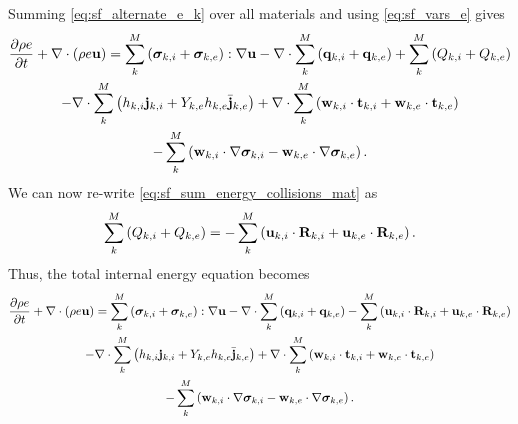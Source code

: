 \documentclass[a4paper,11pt]{report}
\begin{document}
Summing \cref{eq:sf_alternate_e_k} over all materials and using \cref{eq:sf_vars_e} gives
\begin{multline*}
    \frac{\partial \rho e}{\partial t} + \nabla \cdot \left( \rho e \mathbf{u} \right) = \sum_k^M \left( \bm \sigma_{k,i} + \bm \sigma_{k,e} \right) : \nabla \mathbf{u} - \nabla \cdot \sum_k^M \left( \mathbf{q}_{k,i} + \mathbf{q}_{k,e} \right) + \sum_k^M \left( Q_{k,i} + Q_{k,e} \right) \\
    - \nabla \cdot \sum_k^M \left( h_{k,i} \mathbf{j}_{k,i} + Y_{k,e} h_{k,e} \bar{\mathbf{j}}_{k,e} \right) + \nabla \cdot \sum_k^M \left( \mathbf{w}_{k,i} \cdot \mathbf{t}_{k,i} + \mathbf{w}_{k,e} \cdot \mathbf{t}_{k,e} \right) \\
    - \sum_k^M \left( \mathbf{w}_{k,i} \cdot \nabla \bm \sigma_{k,i} - \mathbf{w}_{k,e} \cdot \nabla \bm \sigma_{k,e} \right).
\end{multline*}
We can now re-write \cref{eq:sf_sum_energy_collisions_mat} as 
\begin{equation}
    \sum_k^M \left( Q_{k,i} + Q_{k,e} \right) = -\sum_k^M \left( \mathbf{u}_{k,i} \cdot \mathbf{R}_{k,i} + \mathbf{u}_{k,e} \cdot \mathbf{R}_{k,e} \right).
\end{equation}
Thus, the total internal energy equation becomes
\begin{multline*}
    \frac{\partial \rho e}{\partial t} + \nabla \cdot \left( \rho e \mathbf{u} \right) = \sum_k^M \left( \bm \sigma_{k,i} + \bm \sigma_{k,e} \right): \nabla \mathbf{u} - \nabla \cdot \sum_k^M \left( \mathbf{q}_{k,i} + \mathbf{q}_{k,e} \right) -\sum_k^M \left( \mathbf{u}_{k,i} \cdot \mathbf{R}_{k,i} + \mathbf{u}_{k,e} \cdot \mathbf{R}_{k,e} \right) \\
    - \nabla \cdot \sum_k^M \left( h_{k,i} \mathbf{j}_{k,i} + Y_{k,e} h_{k,e} \bar{\mathbf{j}}_{k,e} \right) + \nabla \cdot \sum_k^M \left( \mathbf{w}_{k,i} \cdot \mathbf{t}_{k,i} + \mathbf{w}_{k,e} \cdot \mathbf{t}_{k,e} \right) \\
    - \sum_k^M \left( \mathbf{w}_{k,i} \cdot \nabla \bm \sigma_{k,i} - \mathbf{w}_{k,e} \cdot \nabla \bm \sigma_{k,e} \right).
\end{multline*}

\end{document}

